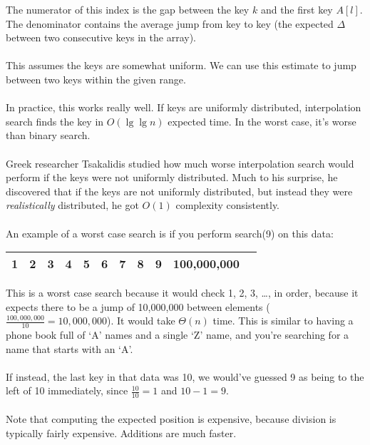 \documentclass[]{article}
\theoremstyle{definition}
\newcommand{\lecture}[1]{\marginpar{{\footnotesize $\leftarrow$ \underline{#1}}}}
\begin{document}
			The numerator of this index is the gap between the key $k$ and the first key $A[l]$. The denominator contains the average jump from key to key (the expected $\Delta$ between two consecutive keys in the array).
			\\ \\
			This assumes the keys are somewhat uniform. We can use this estimate to jump between two keys within the given range.
			\\ \\
			In practice, this works really well. If keys are uniformly distributed, interpolation search finds the key in $O(\lg \lg n)$ expected time. In the worst case, it's worse than binary search.
			\\ \\
			Greek researcher Tsakalidis studied how much worse interpolation search would perform if the keys were not uniformly distributed. Much to his surprise, he discovered that if the keys are not uniformly distributed, but instead they were \emph{realistically} distributed, he got $O(1)$ complexity consistently. 
			\\ \\
			\lecture{March 7, 2013} An example of a worst case search is if you perform search(9) on this data: 
			\begin{center}
				\begin{tabular}{|c|c|c|c|c|c|c|c|c|c|c|}
					\hline
					1 & 2 & 3 & 4 & 5 & 6 & 7 & 8 & 9 & 100,000,000 \\ \hline
				\end{tabular}
			\end{center}
			This is a worst case search because it would check 1, 2, 3, \ldots, in order, because it expects there to be a jump of 10,000,000 between elements ($\frac{100,000,000}{10} = 10,000,000$). It would take $\Theta(n)$ time. This is similar to having a phone book full of `A' names and a single `Z' name, and you're searching for a name that starts with an `A'.
			\\ \\
			If instead, the last key in that data was 10, we would've guessed 9 as being to the left of 10 immediately, since $\frac{10}{10} = 1$ and $10 - 1 = 9$.
			\\ \\
			Note that computing the expected position is expensive, because division is typically fairly expensive. Additions are much faster.
\end{document}
